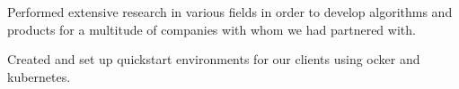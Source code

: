 \documentclass[letterpaper]{deedy-resume} %
\begin{document}
\begin{minipage}[t]{0.66\textwidth}
        \sectionspace %



        \begin{tightitemize}
            \item Performed extensive research in various fields in order to develop algorithms and products for a multitude of companies with whom we had partnered with.
            \item Created and set up quickstart environments for our clients using ocker and kubernetes.
        \end{tightitemize}

        


\end{minipage} %
\end{document}
